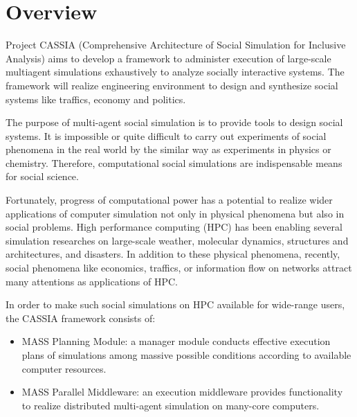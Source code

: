 \section{Overview}
\label{s:Overview}

Project CASSIA (Comprehensive Architecture of Social Simulation for
Inclusive Analysis) aims to develop a framework to administer 
execution of large-scale multiagent simulations exhaustively to analyze
socially interactive systems. The framework will realize engineering
environment to design and synthesize social systems like traffics,
economy and politics.

The purpose of multi-agent social simulation is to provide
tools to design social systems.
It is impossible or quite difficult to carry out experiments
of social phenomena in the real world 
by the similar way as experiments in physics or chemistry.
Therefore, computational social simulations are indispensable means
for social science.

Fortunately,
progress of computational power has a potential to realize wider applications of
computer simulation not only in physical phenomena but also in social 
problems.
High performance computing (HPC) has been enabling several simulation researches
on large-scale weather, molecular dynamics, structures and architectures, and
disasters.
In addition to these physical phenomena,
recently,
social phenomena like economics, traffics, or information flow on
networks
attract many attentions as applications of HPC.

In order to make such social simulations on HPC
available for wide-range users,
the CASSIA framework consists of:
\begin{itemize}
  \item
    MASS Planning Module: a manager module conducts effective
    execution plans of simulations among massive possible conditions
    according to available computer resources.
  \item
    MASS Parallel Middleware: an execution middleware provides
    functionality to realize distributed multi-agent simulation on
    many-core computers.
\end{itemize}

